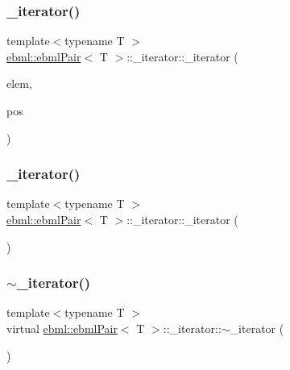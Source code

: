 \subsubsection{\texorpdfstring{\+\_\+iterator()}{\_iterator()}\hspace{0.1cm}{\footnotesize\ttfamily [2/3]}}
{\footnotesize\ttfamily template$<$typename T $>$ \\
\mbox{\hyperlink{classebml_1_1ebmlPair}{ebml\+::ebml\+Pair}}$<$ T $>$\+::\+\_\+iterator\+::\+\_\+iterator (\begin{DoxyParamCaption}\item[{\mbox{\hyperlink{namespaceebml_a15439f6031c0f4ced33b9ab5e28af120}{ebml\+Pair\+\_\+sp}}$<$ T $>$ \&\&}]{elem,  }\item[{unsigned char}]{pos }\end{DoxyParamCaption})\hspace{0.3cm}{\ttfamily [protected]}}

\mbox{\label{classebml_1_1ebmlPair_1_1__iterator_abbf56e96ab5f9bd6acb7b69a2efe2d38}} 
\subsubsection{\texorpdfstring{\+\_\+iterator()}{\_iterator()}\hspace{0.1cm}{\footnotesize\ttfamily [3/3]}}
{\footnotesize\ttfamily template$<$typename T $>$ \\
\mbox{\hyperlink{classebml_1_1ebmlPair}{ebml\+::ebml\+Pair}}$<$ T $>$\+::\+\_\+iterator\+::\+\_\+iterator (\begin{DoxyParamCaption}{ }\end{DoxyParamCaption})}

\mbox{\label{classebml_1_1ebmlPair_1_1__iterator_a03a93396a9ebfae5a550f76eeaed0fb5}} 
\subsubsection{\texorpdfstring{$\sim$\+\_\+iterator()}{~\_iterator()}}
{\footnotesize\ttfamily template$<$typename T $>$ \\
virtual \mbox{\hyperlink{classebml_1_1ebmlPair}{ebml\+::ebml\+Pair}}$<$ T $>$\+::\+\_\+iterator\+::$\sim$\+\_\+iterator (\begin{DoxyParamCaption}{ }\end{DoxyParamCaption})\hspace{0.3cm}{\ttfamily [virtual]}}



